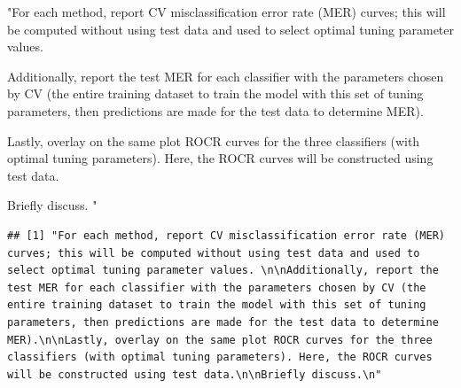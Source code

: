 \documentclass[
  11pt,
]{article}
\newenvironment{Shaded}{\begin{snugshade}}{\end{snugshade}}
\newcommand{\StringTok}[1]{\textcolor[rgb]{0.31,0.60,0.02}{#1}}
\begin{document}
\begin{Shaded}
\begin{Highlighting}[]
\StringTok{"For each method, report CV misclassification error rate (MER) curves; this will be computed without using test data and used to select optimal tuning parameter values. }

\StringTok{Additionally, report the test MER for each classifier with the parameters chosen by CV (the entire training dataset to train the model with this set of tuning parameters, then predictions are made for the test data to determine MER).}

\StringTok{Lastly, overlay on the same plot ROCR curves for the three classifiers (with optimal tuning parameters). Here, the ROCR curves will be constructed using test data.}

\StringTok{Briefly discuss.}
\StringTok{"}
\end{Highlighting}
\end{Shaded}

\begin{verbatim}
## [1] "For each method, report CV misclassification error rate (MER) curves; this will be computed without using test data and used to select optimal tuning parameter values. \n\nAdditionally, report the test MER for each classifier with the parameters chosen by CV (the entire training dataset to train the model with this set of tuning parameters, then predictions are made for the test data to determine MER).\n\nLastly, overlay on the same plot ROCR curves for the three classifiers (with optimal tuning parameters). Here, the ROCR curves will be constructed using test data.\n\nBriefly discuss.\n"
\end{verbatim}
\end{document}
